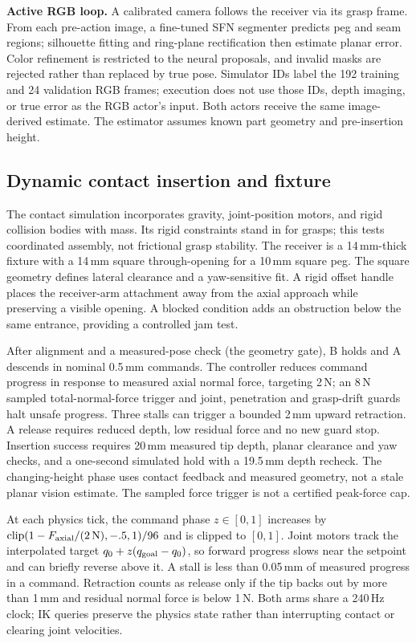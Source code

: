 \documentclass{article}
\begin{document}
\textbf{Active RGB loop.} A calibrated camera follows the receiver via its grasp frame. From each pre-action image, a fine-tuned SFN segmenter predicts peg and seam regions; silhouette fitting and ring-plane rectification then estimate planar error. Color refinement is restricted to the neural proposals, and invalid masks are rejected rather than replaced by true pose. Simulator IDs label the 192 training and 24 validation RGB frames; execution does not use those IDs, depth imaging, or true error as the RGB actor's input. Both actors receive the same image-derived estimate. The estimator assumes known part geometry and pre-insertion height.

\subsection{Dynamic contact insertion and fixture}
The contact simulation incorporates gravity, joint-position motors, and rigid collision bodies with mass. Its rigid constraints stand in for grasps; this tests coordinated assembly, not frictional grasp stability. The receiver is a 14\,mm-thick fixture with a 14\,mm square through-opening for a 10\,mm square peg. The square geometry defines lateral clearance and a yaw-sensitive fit. A rigid offset handle places the receiver-arm attachment away from the axial approach while preserving a visible opening. A blocked condition adds an obstruction below the same entrance, providing a controlled jam test.

After alignment and a measured-pose check (the geometry gate), B holds and A descends in nominal 0.5\,mm commands. The controller reduces command progress in response to measured axial normal force, targeting 2\,N; an 8\,N sampled total-normal-force trigger and joint, penetration and grasp-drift guards halt unsafe progress. Three stalls can trigger a bounded 2\,mm upward retraction. A release requires reduced depth, low residual force and no new guard stop. Insertion success requires 20\,mm measured tip depth, planar clearance and yaw checks, and a one-second simulated hold with a 19.5\,mm depth recheck. The changing-height phase uses contact feedback and measured geometry, not a stale planar vision estimate. The sampled force trigger is not a certified peak-force cap.

At each physics tick, the command phase $z\in[0,1]$ increases by $\operatorname{clip}(1-F_{\rm axial}/(2\,\mathrm{N}),-.5,1)/96$ and is clipped to $[0,1]$. Joint motors track the interpolated target $q_0+z(q_{\rm goal}-q_0)$, so forward progress slows near the setpoint and can briefly reverse above it. A stall is less than 0.05\,mm of measured progress in a command. Retraction counts as release only if the tip backs out by more than 1\,mm and residual normal force is below 1\,N. Both arms share a 240\,Hz clock; IK queries preserve the physics state rather than interrupting contact or clearing joint velocities.
\end{document}
